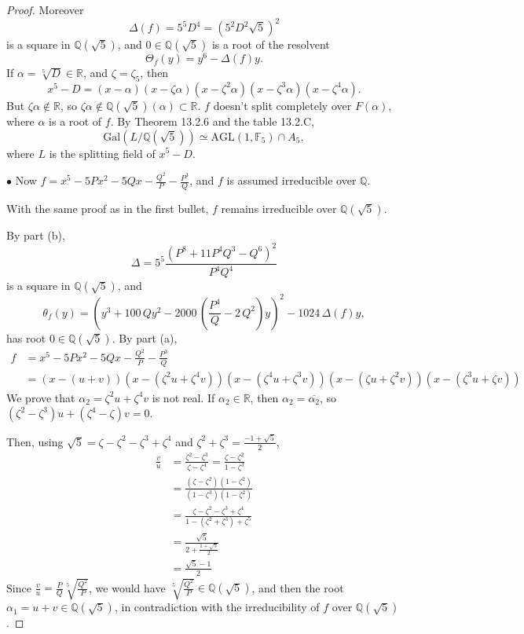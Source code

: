 \documentclass[11pt,a4paper]{article}
\newcommand{\Q}{\mathbb{Q}}
\newcommand{\R}{\mathbb{R}}
\newcommand{\F}{\mathbb{F}}
\newcommand{\Gal}{\mathrm{Gal}}
\begin{document}
\begin{proof}
Moreover
$$\Delta(f) = 5^5 D^4  = (5^2 D^2 \sqrt{5})^2$$
 is a square in $\Q(\sqrt{5})$, and $0 \in \Q(\sqrt{5})$ is a root of the resolvent
$$\Theta_f(y) = y^6 - \Delta(f) y.$$
If $\alpha = \sqrt[5]{D} \in \R$, and $\zeta = \zeta_5$, then 
$$x^5 - D = (x - \alpha)(x-\zeta \alpha)(x-\zeta^2 \alpha)(x-\zeta^3 \alpha)(x-\zeta^4 \alpha).$$
But $\zeta \alpha \not \in \R$, so $\zeta \alpha \not \in \Q(\sqrt{5})(\alpha) \subset \R$. $f$ doesn't split completely over $F(\alpha)$, where $\alpha$ is a root of $f$. By Theorem 13.2.6 and the table 13.2.C, 
$$\Gal(L/\Q(\sqrt{5})) \simeq \mathrm{AGL}(1,\F_5)\cap A_5,$$
where $L$ is the splitting field of $x^5 - D$.
 
 \item[$\bullet$] Now $f= x^5 - 5Px^2-5Qx-\frac{Q^2}{P} - \frac{P^3}{Q}$, and $f$ is assumed irreducible over $\Q$.
 
With the same proof as in the first bullet, $f$ remains irreducible over $\Q(\sqrt{5})$.
 
 By part (b), 
  $$\Delta = 5^5 \frac{(P^8 +11 P^4 Q^3 -Q^6)^2}{P^4Q^4}$$
 is a square in $\Q(\sqrt{5})$, and
 $$\theta_f(y) =  {   \left( y^{3} +100 \, Q y^{2}  - 2000 \, {\left(\frac{P^{4}}{Q} - 2 \,Q^{2}\right)} y\right)}^{2} - 1024 \, \Delta(f) y,$$
 has root $0 \in \Q(\sqrt{5})$.
 By part (a),
\begin{align*}
f &= x^5 - 5Px^2 - 5Qx - \frac{Q^{2}}{P} -\frac{P^{3}}{Q}\\
&=(x - (u+v))(x- (\zeta^2 u + \zeta^4 v))(x- (\zeta^4 u + \zeta^3 v))(x-(\zeta u + \zeta^2 v))(x- (\zeta^3 u + \zeta v))
\end{align*}
We prove that $\alpha_2 = \zeta^2u + \zeta^4v$ is not real. If $\alpha_2 \in \R$, then $\alpha_2 = \overline{\alpha_2}$, so $(\zeta^2 - \zeta^3)u + (\zeta^4 - \zeta) v = 0$. 

Then, using $\sqrt{5} = \zeta - \zeta^2 - \zeta^3 + \zeta^4$ and $\zeta^2 + \zeta^3 = \frac{-1 + \sqrt{5}}{2}$,
\begin{align*}
\frac{v}{u} &= \frac{\zeta^2 - \zeta^3}{\zeta - \zeta^4} = \frac{\zeta - \zeta^2}{1 - \zeta^3}\\
&=\frac{(\zeta - \zeta^2)(1 - \zeta^2)}{(1 - \zeta^3)(1-\zeta^2)}\\
&= \frac{\zeta - \zeta^2 - \zeta^3 + \zeta^4}{1 - (\zeta^2+\zeta^3) + \zeta^5}\\
&= \frac{\sqrt{5}}{2 +\frac{1+\sqrt{5}}{2}}\\
&= \frac{\sqrt{5}-1}{2}
\end{align*}
Since  $\frac{v}{u} = \frac{P}{Q} \sqrt[5]{\frac{Q^2}{P}} $, we would have $\sqrt[5]{\frac{Q^2}{P}} \in \Q(\sqrt{5})$, and then the root $\alpha_1 = u + v\in \Q(\sqrt{5})$, in contradiction with the irreducibility of $f$ over $\Q(\sqrt{5})$.


\end{proof}
\end{document}
